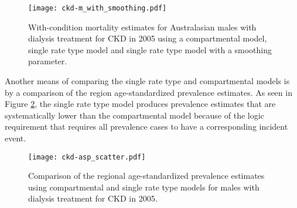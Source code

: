     \begin{figure}[h]
        \begin{center}
            \texttt{[image: ckd-m\_with\_smoothing.pdf]}
            \caption{With-condition mortality estimates for Australasian males with dialysis treatment for CKD in 2005 using a compartmental model, single rate type model and single rate type model with a smoothing parameter.}
            \label{fig:app-CKD smooth}
        \end{center}
    \end{figure}

Another means of comparing the single rate type and compartmental models is by a comparison of the region age-standardized prevalence estimates.  As seen in Figure \ref{fig:app-CKD asp}, the single rate type model produces prevalence estimates that are systematically lower than the compartmental model because of the logic requirement that requires all prevalence cases to have a corresponding incident event.

    \begin{figure}[h]
        \begin{center}
            \texttt{[image: ckd-asp\_scatter.pdf]}
            \caption{Comparison of the regional age-standardized prevalence estimates using compartmental and single rate type models for males with dialysis treatment for CKD in 2005.}
            \label{fig:app-CKD asp}
        \end{center}
    \end{figure} 